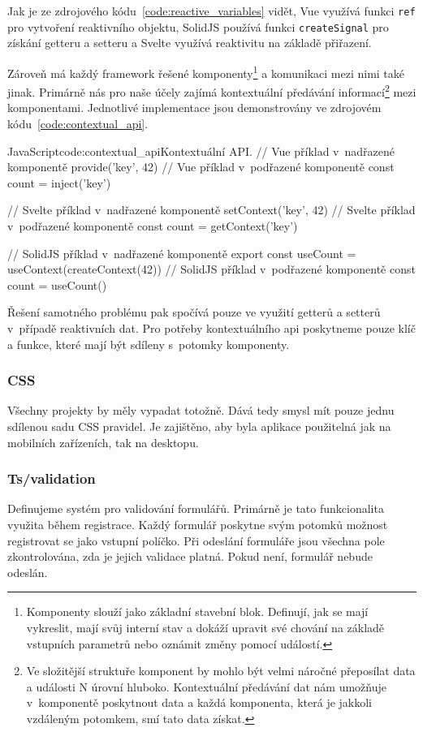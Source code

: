 \documentclass[
  master,
  program=ainf,
  printversion,
  tables=false,
  sourcecodes,
  glossaries,
  index
]{kidiplom}
\begin{document}
Jak je ze zdrojového kódu~\ref{code:reactive_variables} vidět, Vue využívá funkci
{\tt ref} pro vytvoření reaktivního objektu,
SolidJS používá funkci {\tt createSignal} pro získání getteru a setteru a Svelte
využívá reaktivitu na základě přiřazení. 

Zároveň má každý framework řešené komponenty\footnote{Komponenty slouží jako
  základní stavební blok. Definují, jak se mají vykreslit, mají svůj interní
  stav a dokáží upravit své chování na základě vstupních parametrů nebo
  oznámit změny pomocí událostí.} a komunikaci mezi nimi také jinak. Primárně
nás pro naše účely zajímá kontextuální předávání informací\footnote{Ve
  složitější struktuře komponent by mohlo být velmi náročné přeposílat data a
  události N úrovní hluboko. Kontextuální předávání dat nám umožňuje
v~komponentě poskytnout data a každá komponenta, která je jakkoli vzdáleným
  potomkem, smí tato data získat.} mezi komponentami. Jednotlivé implementace 
  jsou demonstrovány ve zdrojovém kódu~\ref{code:contextual_api}.

  \begin{kicode}{JavaScript}{code:contextual_api}{Kontextuální API.}
  // Vue příklad v~nadřazené komponentě
  provide('key', 42)
  // Vue příklad v~podřazené komponentě
  const count = inject('key')

  // Svelte příklad v~nadřazené komponentě
  setContext('key', 42)
  // Svelte příklad v~podřazené komponentě
  const count = getContext('key')

  // SolidJS příklad v~nadřazené komponentě
  export const useCount = useContext(createContext(42))
  // SolidJS příklad v~podřazené komponentě
  const count = useCount()
\end{kicode}

Řešení samotného problému pak spočívá pouze ve využití getterů a setterů
v~případě reaktivních dat. Pro potřeby kontextuálního api poskytneme pouze klíč a
funkce, které mají být sdíleny s~potomky komponenty.

\subsubsection{CSS}
Všechny projekty by měly vypadat totožně. Dává tedy smysl mít pouze jednu
sdílenou sadu CSS pravidel. Je zajištěno, aby byla aplikace použitelná jak na
mobilních zařízeních, tak na desktopu.

\subsubsection{Ts/validation}
Definujeme systém pro validování formulářů. Primárně je tato funkcionalita
využita během registrace. Každý formulář poskytne svým potomků možnost
registrovat se jako vstupní políčko. Při odeslání formuláře jsou všechna pole
zkontrolována, zda je jejich validace platná. Pokud není, formulář nebude
odeslán.
\end{document}
